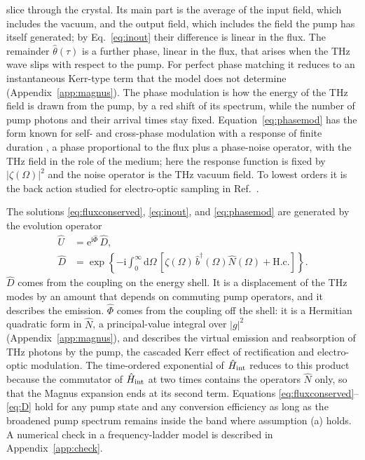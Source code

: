 \documentclass[aps,pra,reprint,superscriptaddress,amsmath,amssymb,floatfix]{revtex4-2}
\newcommand{\Nop}{\hat N}
\newcommand{\dd}{\mathrm{d}}
\newcommand{\ee}{\mathrm{e}}
\newcommand{\ii}{\mathrm{i}}
\begin{document}
slice through the crystal. Its main part is the average of the input field,
which includes the vacuum, and the output field, which includes the field the
pump has itself generated; by Eq.~\eqref{eq:inout} their difference is linear
in the flux. The remainder $\hat\theta(\tau)$ is a further phase, linear in the
flux, that arises when the THz wave slips with respect to the pump. For
perfect phase matching it reduces to an instantaneous Kerr-type term that the
model does not determine (Appendix~\ref{app:magnus}). The phase modulation is
how the energy of the THz field is drawn from the pump, by a red shift of its
spectrum, while the number of pump photons and their arrival times stay fixed.
Equation~\eqref{eq:phasemod} has the form known for self- and cross-phase
modulation with a response of finite duration
\cite{boivin1994,shapirorazavi2007}, a phase proportional to the flux plus a
phase-noise operator, with the THz field in the role of the medium; here the
response function is fixed by $|\zeta(\Omega)|^2$ and the noise operator is
the THz vacuum field. To lowest orders it is the back action studied for
electro-optic sampling in Ref.~\cite{guedes2022}.

The solutions \eqref{eq:fluxconserved}, \eqref{eq:inout}, and
\eqref{eq:phasemod} are generated by the evolution operator
\begin{align}
\hat U&=\ee^{\ii\hat\Phi}\,\hat D,\label{eq:U}\\
\hat D&=\exp\!\left\{-\ii\!\int_0^\infty\!\!\dd\Omega\,
\left[\zeta(\Omega)\,\hat b^\dagger(\Omega)\Nop(\Omega)+\mathrm{H.c.}\right]\right\}.
\label{eq:D}
\end{align}
$\hat D$ comes from the coupling on the energy shell. It is a displacement of
the THz modes by an amount that depends on commuting pump operators, and it
describes the emission. $\hat\Phi$ comes from the coupling off the shell: it
is a Hermitian quadratic form in $\Nop$, a principal-value integral over
$|g|^2$ (Appendix~\ref{app:magnus}), and describes the virtual emission and
reabsorption of THz photons by the pump, the cascaded Kerr effect of
rectification and electro-optic modulation. The time-ordered exponential of
$\hat H_{\rm int}$ reduces to this product because the commutator of
$\hat H_{\rm int}$ at two times contains the operators $\Nop$ only, so that
the Magnus expansion \cite{blanes2009} ends at its second term. Equations
\eqref{eq:fluxconserved}--\eqref{eq:D} hold for any pump state and any
conversion efficiency as long as the broadened pump spectrum remains inside
the band where assumption (a) holds. A numerical check in a frequency-ladder
model is described in Appendix~\ref{app:check}.
\end{document}
